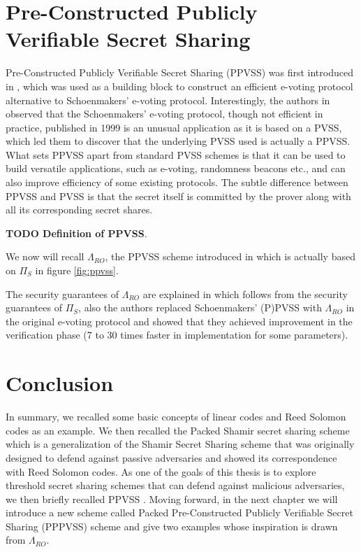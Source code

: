 \section{Pre-Constructed Publicly Verifiable Secret Sharing}
\label{sec:ppvss}
Pre-Constructed Publicly Verifiable Secret Sharing (PPVSS) was first introduced in 
\cite{cryptoeprint:2025/576}, which was used as a building block to 
construct an efficient e-voting protocol alternative to Schoenmakers' e-voting protocol. 
Interestingly, the authors in \cite{cryptoeprint:2025/576} observed that the Schoenmakers' e-voting protocol, though 
not efficient in practice, published in 1999 is an unusual application as it is based on a 
PVSS, which led them to discover that the underlying PVSS used is actually a PPVSS. 
What sets PPVSS apart from standard PVSS schemes is that it can be used to build versatile 
applications, such as e-voting, randomness beacons etc., and can 
also improve efficiency of some existing protocols. The subtle difference between PPVSS and 
PVSS is that the secret itself is committed by the prover along with all its corresponding 
secret shares.\par
\textbf{TODO Definition of PPVSS}.\par
We now will recall 
$\Lambda_{RO}$, the PPVSS scheme introduced in \cite{cryptoeprint:2025/576} which is actually based on 
$\Pi_S$\cite{cryptoeprint:2023/1669} in figure \ref{fig:ppvss}.\par 

The security guarantees of $\Lambda_{RO}$ are explained in \cite{cryptoeprint:2025/576} which follows from 
the security guarantees of $\Pi_S$, also the authors replaced Schoenmakers' (P)PVSS with $\Lambda_{RO}$ in 
the original e-voting protocol\cite{5581ccd9530540479539d21d1d39ae96} and showed that they achieved 
improvement in the verification phase (7 to 30 times faster in implementation for some parameters). 



\section{Conclusion}
In summary, we recalled some basic concepts of linear codes and Reed Solomon codes as an example. We then 
recalled the Packed Shamir secret sharing scheme which is a generalization of the Shamir Secret Sharing scheme \cite{10.1145/359168.359176} 
that was originally designed to defend against passive adversaries and showed its correspondence with 
Reed Solomon codes. As one of the goals of this thesis is to explore threshold secret sharing schemes that 
can defend against malicious adversaries, we then briefly recalled PPVSS \cite{cryptoeprint:2025/576}. Moving forward, in the next chapter we will introduce a new scheme called Packed Pre-Constructed Publicly 
Verifiable Secret Sharing (PPPVSS) scheme and give two examples whose inspiration is drawn from $\Lambda_{RO}$.

